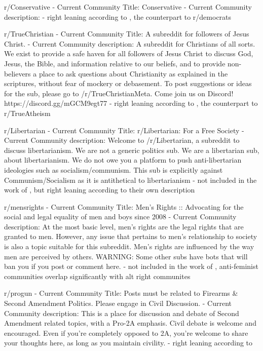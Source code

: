 
r/Conservative
- Current Community Title: Conservative
- Current Community description: 
- right leaning according to \cite{waller2021quantifying}, the counterpart to r/democrats

r/TrueChristian
- Current Community Title: A subreddit for followers of Jesus Christ.
- Current Community description: A subreddit for Christians of all sorts. We exist to provide a safe haven for all followers of Jesus Christ to discuss God, Jesus, the Bible, and information relative to our beliefs, and to provide non-believers a place to ask questions about Christianity as explained in the scriptures, without fear of mockery or debasement. To post suggestions or ideas for the sub, please go to /r/TrueChristianMeta. Come join us on Discord! https://discord.gg/mGCM9egt77
- right leaning according to \cite{waller2021quantifying}, the counterpart to r/TrueAtheism

r/Libertarian
- Current Community Title: r/Libertarian: For a Free Society
- Current Community description: Welcome to /r/Libertarian, a subreddit to discuss libertarianism. We are not a generic politics sub. We are a libertarian sub, about libertarianism. We do not owe you a platform to push anti-libertarian ideologies such as socialism/communism. This sub is explicitly against Communism/Socialism as it is antithetical to libertarianism
- not included in the work of \cite{waller2021quantifying}, but right leaning according to their own description

r/mensrights
- Current Community Title: Men's Rights :: Advocating for the social and legal equality of men and boys since 2008
- Current Community description: At the most basic level, men's rights are the legal rights that are granted to men. However, any issue that pertains to men's relationship to society is also a topic suitable for this subreddit. Men's rights are influenced by the way men are perceived by others. WARNING: Some other subs have bots that will ban you if you post or comment here.
- not included in the work of \cite{waller2021quantifying}, anti-feminist communities overlap significantly with alt right communites \cite{mamie2021anti}

r/progun
- Current Community Title: Posts must be related to Firearms \& Second Amendment Politics. Please engage in Civil Discussion.
- Current Community description: This is a place for discussion and debate of Second Amendment related topics, with a Pro-2A emphasis. Civil debate is welcome and encouraged. Even if you're completely opposed to 2A, you're welcome to share your thoughts here, as long as you maintain civility.
- right leaning according to \cite{waller2021quantifying}


